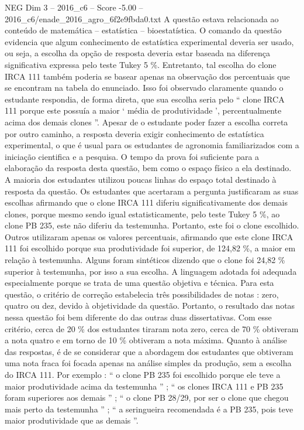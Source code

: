 \begin{textsample}{NEG Dim 3 – 2016\_c6 – Score -5.00 – 2016\_c6/enade\_2016\_agro\_6f2e9fbda0.txt}
A questão estava relacionada ao conteúdo de matemática – estatística – bioestatística.
O comando da questão evidencia que algum conhecimento de estatística experimental deveria ser usado, ou seja, a escolha da opção de resposta deveria estar baseada na diferença significativa expressa pelo teste Tukey 5 \%.
Entretanto, tal escolha do clone IRCA 111 também poderia se basear apenas na observação dos percentuais que se encontram na tabela do enunciado.
Isso foi observado claramente quando o estudante respondia, de forma direta, que sua escolha seria pelo “ clone IRCA 111 porque este possuía a maior ‘ média de produtividade ’, percentualmente acima dos demais clones ”.
Apesar de o estudante poder fazer a escolha correta por outro caminho, a resposta deveria exigir conhecimento de estatística experimental, o que é usual para os estudantes de agronomia familiarizados com a iniciação cientifica e a pesquisa.
O tempo da prova foi suficiente para a elaboração da resposta desta questão, bem como o espaço físico a ela destinado.
A maioria dos estudantes utilizou poucas linhas do espaço total destinado à resposta da questão.
Os estudantes que acertaram a pergunta justificaram as suas escolhas afirmando que o clone IRCA 111 diferiu significativamente dos demais clones, porque mesmo sendo igual estatisticamente, pelo teste Tukey 5 \%, ao clone PB 235, este não diferiu da testemunha.
Portanto, este foi o clone escolhido.
Outros utilizaram apenas os valores percentuais, afirmando que este clone IRCA 111 foi escolhido porque sua produtividade foi superior, de 124,82 \%, a maior em relação à testemunha.
Alguns foram sintéticos dizendo que o clone foi 24,82 \% superior à testemunha, por isso a sua escolha.
A linguagem adotada foi adequada especialmente porque se trata de uma questão objetiva e técnica.
Para esta questão, o critério de correção estabelecia três possibilidades de notas : zero, quatro ou dez, devido à objetividade da questão.
Portanto, o resultado das notas nessa questão foi bem diferente do das outras duas dissertativas.
Com esse critério, cerca de 20 \% dos estudantes tiraram nota zero, cerca de 70 \% obtiveram a nota quatro e em torno de 10 \% obtiveram a nota máxima.
Quanto à análise das respostas, é de se considerar que a abordagem dos estudantes que obtiveram uma nota fraca foi focada apenas na análise simples da produção, sem a escolha do IRCA 111.
Por exemplo : “ o clone PB 235 foi escolhido porque ele teve a maior produtividade acima da testemunha ” ; “ os clones IRCA 111 e PB 235 foram superiores aos demais ” ; “ o clone PB 28/29, por ser o clone que chegou mais perto da testemunha ” ; “ a seringueira recomendada é a PB 235, pois teve maior produtividade que as demais ”.

\end{textsample}
